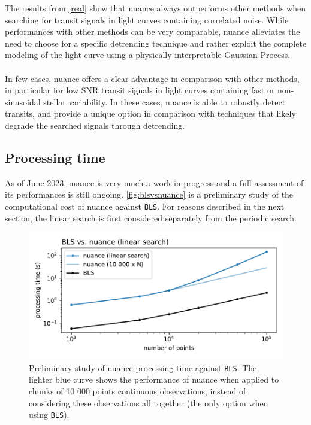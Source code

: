 \documentclass{aastex631}
\begin{document}
The results from \autoref{real} show that \textsf{nuance} always outperforms other methods when searching for transit signals in light curves containing correlated noise. While performances with other methods can be very comparable, \textsf{nuance} alleviates the need to choose for a specific detrending technique and rather exploit the complete modeling of the light curve using a physically interpretable Gaussian Process.\\\\
In few cases, \textsf{nuance} offers a clear advantage in comparison with other methods, in particular for low SNR transit signals in light curves containing fast or non-sinusoidal stellar variability. In these cases, \textsf{nuance} is able to robustly detect transits, and provide a unique option in comparison with techniques that likely degrade the searched signals through detrending.

\subsection*{Processing time}
As of June 2023, \textsf{nuance} is very much a work in progress and a full assessment of its performances is still ongoing. \autoref{fig:blsvsnuance} is a preliminary study of the computational cost of \textsf{nuance} against \texttt{BLS}. For reasons described in the next section, the linear search is first considered separately from the periodic search.

\begin{figure}[H]
    \begin{centering}
        \includegraphics[width=0.8\linewidth]{nuance_vs_bls_time.pdf}
        \caption{Preliminary study of \textsf{nuance} processing time against \texttt{BLS}. The lighter blue curve shows the performance of \textsf{nuance} when applied to chunks of 10 000 points continuous observations, instead of considering these observations all together (the only option when using \texttt{BLS}).}
        \label{fig:blsvsnuance}
    \end{centering}
\end{figure}
\end{document}
